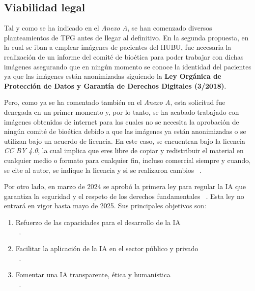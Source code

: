 \subsection{Viabilidad legal}

Tal y como se ha indicado en el \textit{Anexo A}, se han comenzado diversos planteamientos de TFG antes de llegar al definitivo. En la segunda propuesta, en la cual se iban a emplear imágenes de pacientes del HUBU, fue necesaria la realización de un informe del comité de bioética para poder trabajar con dichas imágenes asegurando que en ningún momento se conoce la identidad del pacientes ya que las imágenes están anonimizadas siguiendo la \textbf{Ley Orgánica de Protección de Datos y Garantía de Derechos Digitales (3/2018)}. 

Pero, como ya se ha comentado también en el \textit{Anexo A}, esta solicitud fue denegada en un primer momento y, por lo tanto, se ha acabado trabajado con imágenes obtenidas de internet para las cuales no se necesita la aprobación de ningún comité de bioética debido a que las imágenes ya están anonimizadas o se utilizan bajo un acuerdo de licencia. En este caso, se encuentran bajo la licencia \textit{CC BY 4.0}, la cual implica que eres libre de copiar y redistribuir el material en cualquier medio o formato para cualquier fin, incluso comercial siempre y cuando, se cite al autor, se indique la licencia y si se realizaron cambios ~\cite{Creativecommons24}.

Por otro lado, en marzo de 2024 se aprobó la primera ley para regular la IA que garantiza la seguridad y el respeto de los derechos fundamentales ~\cite{NoticiasEuropeo24}. Esta ley no entrará en vigor hasta mayo de 2025. Sus principales objetivos son:

\begin{enumerate}
    \item Refuerzo de las capacidades para el desarrollo de la IA\\ ~\cite{GobiernoEspaña24}.
    \item Facilitar la aplicación de la IA en el sector público y privado\\ ~\cite{GobiernoEspaña24}.
    \item Fomentar una IA transparente, ética y humanística\\ ~\cite{GobiernoEspaña24}.
\end{enumerate}








